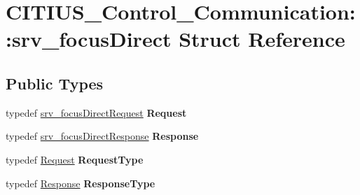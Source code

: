 \hypertarget{struct_c_i_t_i_u_s___control___communication_1_1srv__focus_direct}{\section{\-C\-I\-T\-I\-U\-S\-\_\-\-Control\-\_\-\-Communication\-:\-:srv\-\_\-focus\-Direct \-Struct \-Reference}
\label{struct_c_i_t_i_u_s___control___communication_1_1srv__focus_direct}
}
\subsection*{\-Public \-Types}
\begin{DoxyCompactItemize}
\item 
\hypertarget{struct_c_i_t_i_u_s___control___communication_1_1srv__focus_direct_a8ca4b1dcfcfe57ae07c61af8f74a34ea}{typedef \hyperlink{struct_c_i_t_i_u_s___control___communication_1_1srv__focus_direct_request__}{srv\-\_\-focus\-Direct\-Request} {\bfseries \-Request}}\label{struct_c_i_t_i_u_s___control___communication_1_1srv__focus_direct_a8ca4b1dcfcfe57ae07c61af8f74a34ea}

\item 
\hypertarget{struct_c_i_t_i_u_s___control___communication_1_1srv__focus_direct_a2ad965b1ca75a4a3d32423804a69f44b}{typedef \hyperlink{struct_c_i_t_i_u_s___control___communication_1_1srv__focus_direct_response__}{srv\-\_\-focus\-Direct\-Response} {\bfseries \-Response}}\label{struct_c_i_t_i_u_s___control___communication_1_1srv__focus_direct_a2ad965b1ca75a4a3d32423804a69f44b}

\item 
\hypertarget{struct_c_i_t_i_u_s___control___communication_1_1srv__focus_direct_a9792e97f42b7ce09d95b300813675a6b}{typedef \hyperlink{struct_c_i_t_i_u_s___control___communication_1_1srv__focus_direct_request__}{\-Request} {\bfseries \-Request\-Type}}\label{struct_c_i_t_i_u_s___control___communication_1_1srv__focus_direct_a9792e97f42b7ce09d95b300813675a6b}

\item 
\hypertarget{struct_c_i_t_i_u_s___control___communication_1_1srv__focus_direct_ab028ec4e6dd3fbda40911cc841089ac3}{typedef \hyperlink{struct_c_i_t_i_u_s___control___communication_1_1srv__focus_direct_response__}{\-Response} {\bfseries \-Response\-Type}}\label{struct_c_i_t_i_u_s___control___communication_1_1srv__focus_direct_ab028ec4e6dd3fbda40911cc841089ac3}

\end{DoxyCompactItemize}
